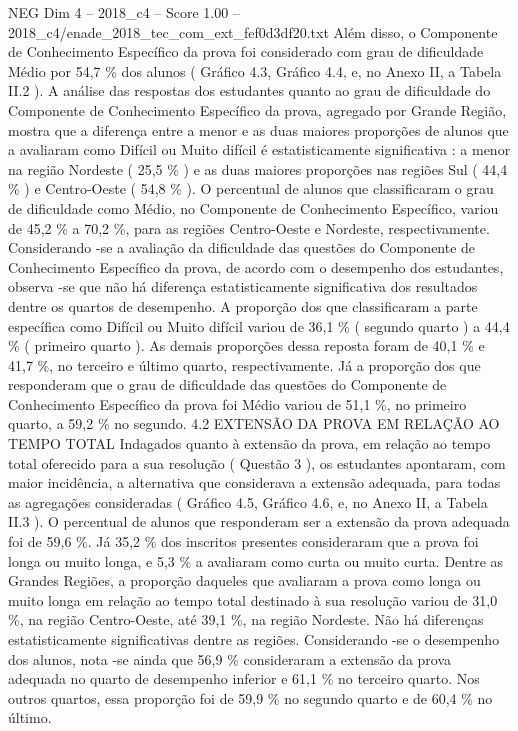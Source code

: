 \begin{textsample}{NEG Dim 4 – 2018\_c4 – Score 1.00 – 2018\_c4/enade\_2018\_tec\_com\_ext\_fef0d3df20.txt}
Além disso, o Componente de Conhecimento Específico da prova foi considerado com grau de dificuldade Médio por 54,7 \% dos alunos ( Gráfico 4.3, Gráfico 4.4, e, no Anexo II, a Tabela II.2 ).
A análise das respostas dos estudantes quanto ao grau de dificuldade do Componente de Conhecimento Específico da prova, agregado por Grande Região, mostra que a diferença entre a menor e as duas maiores proporções de alunos que a avaliaram como Difícil ou Muito difícil é estatisticamente significativa : a menor na região Nordeste ( 25,5 \% ) e as duas maiores proporções nas regiões Sul ( 44,4 \% ) e Centro-Oeste ( 54,8 \% ).
O percentual de alunos que classificaram o grau de dificuldade como Médio, no Componente de Conhecimento Específico, variou de 45,2 \% a 70,2 \%, para as regiões Centro-Oeste e Nordeste, respectivamente.
Considerando -se a avaliação da dificuldade das questões do Componente de Conhecimento Específico da prova, de acordo com o desempenho dos estudantes, observa -se que não há diferença estatisticamente significativa dos resultados dentre os quartos de desempenho.
A proporção dos que classificaram a parte específica como Difícil ou Muito difícil variou de 36,1 \% ( segundo quarto ) a 44,4 \% ( primeiro quarto ).
As demais proporções dessa reposta foram de 40,1 \% e 41,7 \%, no terceiro e último quarto, respectivamente.
Já a proporção dos que responderam que o grau de dificuldade das questões do Componente de Conhecimento Específico da prova foi Médio variou de 51,1 \%, no primeiro quarto, a 59,2 \% no segundo. 4.2 EXTENSÃO DA PROVA EM RELAÇÃO AO TEMPO TOTAL Indagados quanto à extensão da prova, em relação ao tempo total oferecido para a sua resolução ( Questão 3 ), os estudantes apontaram, com maior incidência, a alternativa que considerava a extensão adequada, para todas as agregações consideradas ( Gráfico 4.5, Gráfico 4.6, e, no Anexo II, a Tabela II.3 ).
O percentual de alunos que responderam ser a extensão da prova adequada foi de 59,6 \%.
Já 35,2 \% dos inscritos presentes consideraram que a prova foi longa ou muito longa, e 5,3 \% a avaliaram como curta ou muito curta.
Dentre as Grandes Regiões, a proporção daqueles que avaliaram a prova como longa ou muito longa em relação ao tempo total destinado à sua resolução variou de 31,0 \%, na região Centro-Oeste, até 39,1 \%, na região Nordeste.
Não há diferenças estatisticamente significativas dentre as regiões.
Considerando -se o desempenho dos alunos, nota -se ainda que 56,9 \% consideraram a extensão da prova adequada no quarto de desempenho inferior e 61,1 \% no terceiro quarto.
Nos outros quartos, essa proporção foi de 59,9 \% no segundo quarto e de 60,4 \% no último.

\end{textsample}
